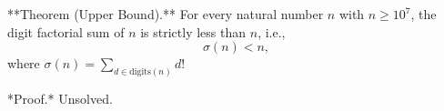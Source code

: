 
**Theorem (Upper Bound).** For every natural number $n$ with $n \geq 10^7$, the digit factorial sum of $n$ is strictly less than $n$, i.e., $$\sigma(n) < n,$$ where $\sigma(n) = \sum_{d \in \text{digits}(n)} d!$

*Proof.* Unsolved.